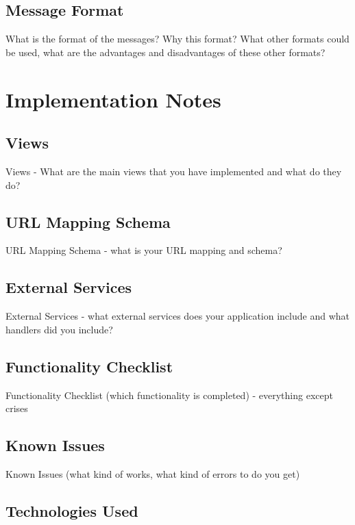 \documentclass{sig-alt-release2}
\begin{document}
\subsection{Message Format}

What is the format of the messages? 
Why this format? 
What other formats could be used, what are the advantages and disadvantages of these other formats?

\section{Implementation Notes}

\subsection{Views}

Views - What are the main views that you have implemented and what do they do?

\subsection{URL Mapping Schema}

URL Mapping Schema - what is your URL mapping and schema?

\subsection{External Services}

External Services  - what external services does your application include and what handlers did you include?

\subsection{Functionality Checklist}

Functionality Checklist (which functionality is completed) - everything except crises

\subsection{Known Issues}

Known Issues (what kind of works, what kind of errors to do you get)

\subsection{Technologies Used}
\end{document}
